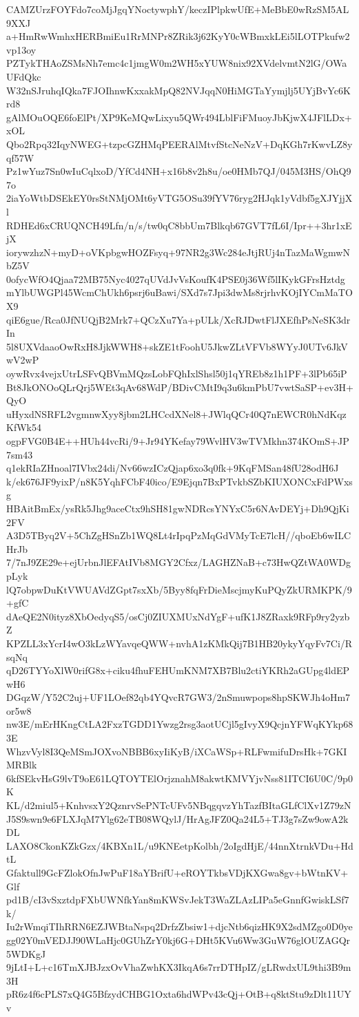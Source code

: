 CAMZUrzFOYFdo7coMjJgqYNoctywphY/keczIPlpkwUfE+MeBbE0wRzSM5AL9XXJ
a+HmRwWmhxHERBmiEu1RrMNPr8ZRik3j62KyY0cWBmxkLEi5lLOTPkufw2vp13oy
PZTykTHAoZSMsNh7emc4c1jmgW0m2WH5xYUW8nix92XVdelvmtN2lG/OWaUFdQkc
W32nSJruhqIQka7FJOIhnwKxxakMpQ82NVJqqN0HiMGTaYymjlj5UYjBvYc6Krd8
gAlMOuOQE6foElPt/XP9KeMQwLixyu5QWr494LblFiFMuoyJbKjwX4JFlLDx+xOL
Qbo2Rpq32IqyNWEG+tzpcGZHMqPEERAlMtvfStcNeNzV+DqKGh7rKwvLZ8yqf57W
Pz1wYuz7Sn0wIuCqlxoD/YfCd4NH+x16b8v2h8u/oe0HMb7QJ/045M3HS/OhQ97o
2iaYoWtbDSEkEY0rsStNMjOMt6yVTG5OSu39fYV76ryg2HJqk1yVdbf5gXJYjjXl
RDHEd6xCRUQNCH49Lfn/n/s/tw0qC8bbUm7Blkqb67GVT7fL6I/Ipr++3hr1xEjX
iorywzhzN+myD+oVKpbgwHOZFsyq+97NR2g3Wc284eJtjRUj4nTazMaWgmwNbZ5V
0ofycWfO4Qjaa72MB75Nyc4027qUVdJvVsKoufK4PSE0j36Wf5lIKykGFrsHztdg
mYlbUWGPl45WcmChUkh6psrj6uBawi/SXd7s7Jpi3dwMs8rjrhvKOjIYCmMaTOX9
qiE6gue/Rca0JfNUQjB2Mrk7+QCzXu7Ya+pULk/XcRJDwtFlJXEfhPsNeSK3drIn
5l8UXVdaaoOwRxH8JjkWWH8+skZE1tFoohU5JkwZLtVFVb8WYyJ0UTv6JkVwV2wP
oywRvx4vejxUtrLSFvQBVmMQzsLobFQhIxlShsl50j1qYREb8z1h1PF+3lPb65iP
Bt8JkONOoQLrQrj5WEt3qAv68WdP/BDivCMtI9q3u6kmPbU7vwtSaSP+ev3H+QyO
uHyxdNSRFL2vgmnwXyy8jbm2LHCcdXNel8+JWlqQCr40Q7nEWCR0hNdKqzKfWk54
ogpFVG0B4E++HUh44vcRi/9+Jr94YKefay79WvlHV3wTVMkhn374KOmS+JP7sm43
q1ekRIaZHnoal7IVbx24di/Nv66wzICzQjap6xo3q0fk+9KqFMSan48fU28odH6J
k/ek676JF9yixP/n8K5YqhFCbF40ico/E9Ejqn7BxPTvkbSZbKIUXONCxFdPWxsg
HBAitBmEx/ysRk5Jhg9aceCtx9hSH81gwNDRcsYNYxC5r6NAvDEYj+Dh9QjKi2FV
A3D5TByq2V+5ChZgHSnZb1WQ8Lt4rIpqPzMqGdVMyTcE7lcH//qboEb6wILCHrJb
7/7nJ9ZE29e+ejUrbnJlEFAtIVb8MGY2Cfxz/LAGHZNaB+c73HwQZtWA0WDgpLyk
lQ7obpwDuKtVWUAVdZGpt7sxXb/5Byy8fqFrDieMscjmyKuPQyZkURMKPK/9+gfC
dAeQE2N0ityz8XbOedyqS5/osCj0ZIUXMUxNdYgF+ufK1J8ZRaxk9RFp9ry2yzbZ
KPZLL3xYcrI4wO3kLzWYavqeQWW+nvhA1zKMkQij7B1HB20ykyYqyFv7Ci/RsqNq
qD26TYYoXlW0rifG8x+ciku4fhuFEHUmKNM7XB7Blu2ctiYKRh2aGUpg4ldEPwH6
DGqzW/Y52C2uj+UF1LOef82qb4YQvcR7GW3/2nSmuwpops8hpSKWJh4oHm7or5w8
nw3E/mErHKngCtLA2FxzTGDD1Ywzg2rsg3aotUCjl5gIvyX9QcjnYFWqKYkp683E
WhzvVyl8I3QeMSmJOXvoNBBB6xyIiKyB/iXCaWSp+RLFwmifuDrsHk+7GKIMRBlk
6kfSEkvHsG9lvT9oE61LQTOYTElOrjznahM8akwtKMVYjvNss81ITCI6U0C/9p0K
KL/d2miul5+KnhvsxY2QznrvSePNTcUFv5NBqgqvzYhTazfBItaGLfClXv1Z79zN
J5S9swn9e6FLXJqM7Ylg62eTB08WQylJ/HrAgJFZ0Qa24L5+TJ3g7sZw9owA2kDL
LAXO8CkonKZkGzx/4KBXn1L/u9KNEetpKolbh/2oIgdHjE/44nnXtrnkVDu+HdtL
Gfaktull9GcFZlokOfnJwPuF18aYBrifU+eROYTkbsVDjKXGwa8gv+bWtnKV+Glf
pd1B/cI3vSxztdpFXbUWNfkYan8mKWSvJekT3WaZLAzLIPa5eGnnfGwiskLSf7k/
Iu2rWmqiTIhRRN6EZJWBtaNspq2DrfzZbsiw1+djcNtb6qizHK9X2sdMZgo0D0ye
gg02Y0mVEDJJ90WLaHjc0GUhZrY0kj6G+DHt5KVu6Ww3GuW76glOUZAGQr5WDKgJ
9jLtI+L+c16TmXJBJzxOvVhaZwhKX3IkqA6s7rrDTHpIZ/gLRwdxUL9thi3B9m3H
pR6z4f6cPLS7xQ4G5BfzydCHBG1Oxta6hdWPv43cQj+OtB+q8ktStu9zDlt11UYv
